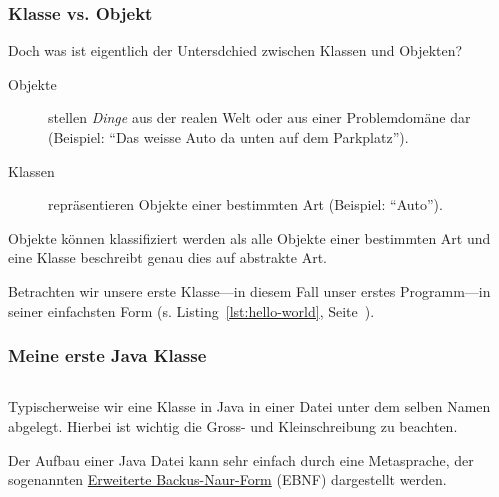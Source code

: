 \begin{frame}[fragile]
    \frametitle<presentation>{Klasse vs. Objekt}

    Doch was ist eigentlich der Untersdchied zwischen Klassen und Objekten?

    \begin{description}
        \item[Objekte] stellen \emph{Dinge} aus der realen Welt oder aus einer Problemdomäne
        dar (Beispiel: ``Das weisse Auto da unten auf dem Parkplatz'').
        \item[Klassen] repräsentieren Objekte einer bestimmten Art (Beispiel: ``Auto'').
    \end{description}

\end{frame}

Objekte können klassifiziert werden als alle Objekte einer bestimmten Art und
eine Klasse beschreibt genau dies auf abstrakte Art.

Betrachten wir unsere erste Klasse---in diesem Fall unser erstes Programm---in
seiner einfachsten Form (s. Listing~\ref{lst:hello-world}, Seite~\pageref{lst:hello-world}).

\begin{frame}[fragile]
    \frametitle<presentation>{Meine erste Java Klasse}

    \inputminted[frame=single,samepage]{java}{../java/academy/HelloWorld.java}

\end{frame}

\mode*
{}

Typischerweise wir eine Klasse in Java in einer Datei unter dem selben Namen abgelegt.
Hierbei ist wichtig die Gross- und Kleinschreibung zu beachten.


Der Aufbau einer Java Datei kann sehr einfach durch eine Metasprache, der sogenannten
\href{https://de.wikipedia.org/wiki/Erweiterte_Backus-Naur-Form}{Erweiterte Backus-Naur-Form}
(EBNF) dargestellt werden.

